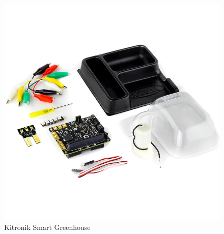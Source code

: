 \begin{figure}[ht]
    \centering
    \includegraphics[scale=0.4]{Report/Images/KitronikGreenhouse.png}
    \caption{Kitronik Smart Greenhouse \cite{kitronikStore}}
    \label{fig:KitronikGreenhouse}
\end{figure}
